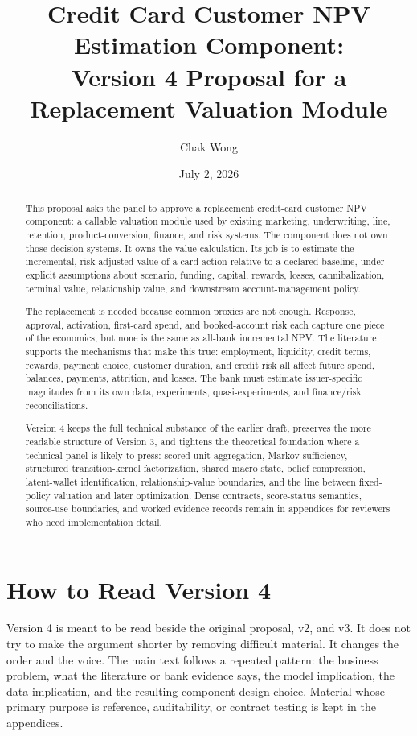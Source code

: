 \documentclass[11pt]{article}
\title{Credit Card Customer NPV Estimation Component:\\
Version 4 Proposal for a Replacement Valuation Module}
\author{Chak Wong}
\date{July 2, 2026}
\newcommand{\1}{\mathbf{1}}
\begin{document}
\maketitle

\begin{abstract}
This proposal asks the panel to approve a replacement credit-card customer NPV
component: a callable valuation module used by existing marketing,
underwriting, line, retention, product-conversion, finance, and risk systems.
The component does not own those decision systems. It owns the value
calculation. Its job is to estimate the incremental, risk-adjusted value of a
card action relative to a declared baseline, under explicit assumptions about
scenario, funding, capital, rewards, losses, cannibalization, terminal value,
relationship value, and downstream account-management policy.

The replacement is needed because common proxies are not enough. Response,
approval, activation, first-card spend, and booked-account risk each capture
one piece of the economics, but none is the same as all-bank incremental NPV.
The literature supports the mechanisms that make this true: employment,
liquidity, credit terms, rewards, payment choice, customer duration, and credit
risk all affect future spend, balances, payments, attrition, and losses. The
bank must estimate issuer-specific magnitudes from its own data, experiments,
quasi-experiments, and finance/risk reconciliations.

Version 4 keeps the full technical substance of the earlier draft, preserves
the more readable structure of Version 3, and tightens the theoretical
foundation where a technical panel is likely to press: scored-unit aggregation,
Markov sufficiency, structured transition-kernel factorization, shared macro
state, belief compression, latent-wallet identification, relationship-value
boundaries, and the line between fixed-policy valuation and later optimization.
Dense contracts, score-status semantics, source-use boundaries, and worked
evidence records remain in appendices for reviewers who need implementation
detail.
\end{abstract}

\section*{How to Read Version 4}

Version 4 is meant to be read beside the original proposal, v2, and v3. It does not
try to make the argument shorter by removing difficult material. It changes the
order and the voice. The main text follows a repeated pattern: the business
problem, what the literature or bank evidence says, the model implication, the
data implication, and the resulting component design choice. Material whose
primary purpose is reference, auditability, or contract testing is kept in the
appendices.
\end{document}
